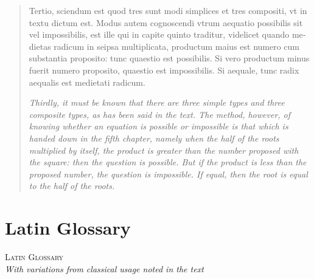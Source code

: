 \documentclass[11pt,a4paper,twoside]{book}
\begin{document}
\begin{quote}
\textlatin{Tertio, sciendum est quod tres sunt modi simplices et tres compositi, vt in textu dictum est. Modus autem cognoscendi vtrum aequatio possibilis sit vel impossibilis, est ille qui in capite quinto traditur, videlicet quando medietas radicum in seipsa multiplicata, productum maius est numero cum substantia proposito: tunc quaestio est possibilis. Si vero productum minus fuerit numero proposito, quaestio est impossibilis. Si aequale, tunc radix aequalis est medietati radicum.}

\smallskip
\textit{Thirdly, it must be known that there are three simple types and three composite types, as has been said in the text. The method, however, of knowing whether an equation is possible or impossible is that which is handed down in the fifth chapter, namely when the half of the roots multiplied by itself, the product is greater than the number proposed with the square: then the question is possible. But if the product is less than the proposed number, the question is impossible. If equal, then the root is equal to the half of the roots.}
\end{quote}

\part*{Latin Glossary}

\begin{center}
\textsc{Latin Glossary}\\
\textit{With variations from classical usage noted in the text}
\end{center}
\end{document}
